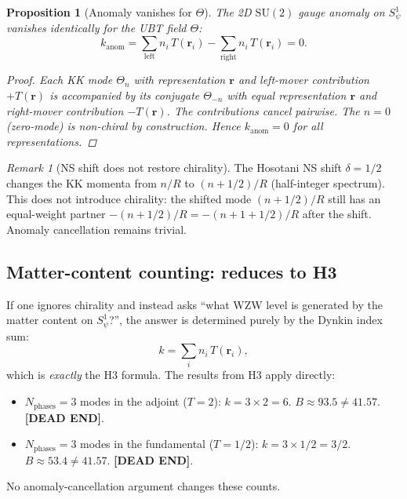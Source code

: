 \documentclass[11pt,a4paper]{article}
\newtheorem{proposition}{Proposition}
\theoremstyle{definition}
\theoremstyle{remark}
\newtheorem{remark}{Remark}
\begin{document}
\begin{proposition}[Anomaly vanishes for $\Theta$]
  \label{prop:no_anomaly}
  The 2D $\mathrm{SU}(2)$ gauge anomaly on $S^1_\psi$ vanishes
  identically for the UBT field $\Theta$:
  \begin{equation}
    k_{\mathrm{anom}} =
    \sum_{\text{left}} n_i\,T(\mathbf{r}_i)
    - \sum_{\text{right}} n_i\,T(\mathbf{r}_i) = 0.
  \end{equation}
  \begin{proof}
    Each KK mode $\Theta_n$ with representation $\mathbf{r}$ and
    left-mover contribution $+T(\mathbf{r})$ is accompanied by its
    conjugate $\Theta_{-n}$ with equal representation $\mathbf{r}$ and
    right-mover contribution $-T(\mathbf{r})$.  The contributions cancel
    pairwise.  The $n = 0$ (zero-mode) is non-chiral by construction.
    Hence $k_{\mathrm{anom}} = 0$ for all representations.
  \end{proof}
\end{proposition}

\begin{remark}[NS shift does not restore chirality]
  The Hosotani NS shift $\delta = 1/2$ changes the KK momenta from
  $n/R$ to $(n + 1/2)/R$ (half-integer spectrum).  This does not
  introduce chirality: the shifted mode $(n+1/2)/R$ still has an
  equal-weight partner $-(n+1/2)/R = -(n+1+1/2)/R$ after the shift.
  Anomaly cancellation remains trivial.
\end{remark}

\subsection{Matter-content counting: reduces to H3}

If one ignores chirality and instead asks ``what WZW level is
generated by the matter content on $S^1_\psi$?'', the answer is
determined purely by the Dynkin index sum:
\begin{equation}
  k = \sum_i n_i\,T(\mathbf{r}_i),
  \label{eq:k_dynkin_I4}
\end{equation}
which is \emph{exactly} the H3 formula.  The results from H3 apply
directly:
\begin{itemize}
  \item $N_{\mathrm{phases}} = 3$ modes in the adjoint ($T = 2$):
    $k = 3 \times 2 = 6$.  $B \approx 93.5 \neq 41.57$.
    \textbf{[DEAD END]}.
  \item $N_{\mathrm{phases}} = 3$ modes in the fundamental ($T = 1/2$):
    $k = 3 \times 1/2 = 3/2$.  $B \approx 53.4 \neq 41.57$.
    \textbf{[DEAD END]}.
\end{itemize}
No anomaly-cancellation argument changes these counts.
\end{document}
